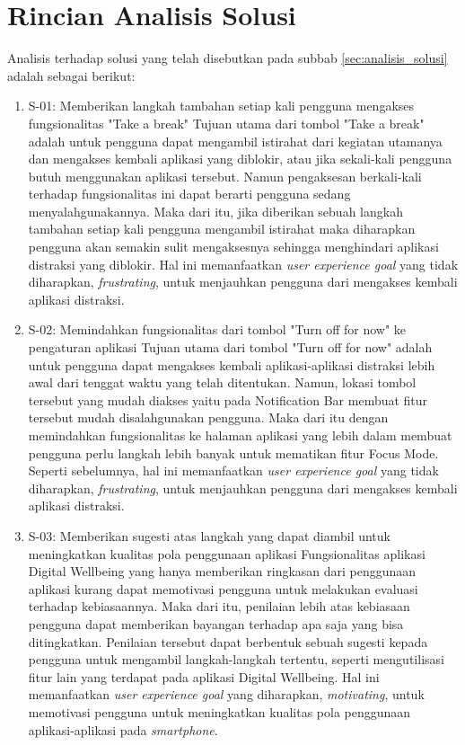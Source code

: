 \chapter{Rincian Analisis Solusi}
\label{chpt:rincian_analisis_solusi}

Analisis terhadap solusi yang telah disebutkan pada subbab \ref{sec:analisis_solusi} adalah sebagai berikut:

\begin{enumerate}
  \item S-01: Memberikan langkah tambahan setiap kali pengguna mengakses fungsionalitas "Take a break"
  \subitem
  Tujuan utama dari tombol "Take a break" adalah untuk pengguna dapat mengambil istirahat dari kegiatan utamanya dan mengakses kembali aplikasi yang diblokir, atau jika sekali-kali pengguna butuh menggunakan aplikasi tersebut. Namun pengaksesan berkali-kali terhadap fungsionalitas ini dapat berarti pengguna sedang menyalahgunakannya. Maka dari itu, jika diberikan sebuah langkah tambahan setiap kali pengguna mengambil istirahat maka diharapkan pengguna akan semakin sulit mengaksesnya sehingga menghindari aplikasi distraksi yang diblokir. Hal ini memanfaatkan \textit{user experience goal} yang tidak diharapkan, \textit{frustrating}, untuk menjauhkan pengguna dari mengakses kembali aplikasi distraksi.
  
  \item S-02: Memindahkan fungsionalitas dari tombol "Turn off for now" ke pengaturan aplikasi
  \subitem
  Tujuan utama dari tombol "Turn off for now" adalah untuk pengguna dapat mengakses kembali aplikasi-aplikasi distraksi lebih awal dari tenggat waktu yang telah ditentukan. Namun, lokasi tombol tersebut yang mudah diakses yaitu pada Notification Bar membuat fitur tersebut mudah disalahgunakan pengguna. Maka dari itu dengan memindahkan fungsionalitas ke halaman aplikasi yang lebih dalam membuat pengguna perlu langkah lebih banyak untuk mematikan fitur Focus Mode. Seperti sebelumnya, hal ini memanfaatkan \textit{user experience goal} yang tidak diharapkan, \textit{frustrating}, untuk menjauhkan pengguna dari mengakses kembali aplikasi distraksi. 
  
  \item S-03: Memberikan sugesti atas langkah yang dapat diambil untuk meningkatkan kualitas pola penggunaan aplikasi
  \subitem Fungsionalitas aplikasi Digital Wellbeing yang hanya memberikan ringkasan dari penggunaan aplikasi kurang dapat memotivasi pengguna untuk melakukan evaluasi terhadap kebiasaannya. Maka dari itu, penilaian lebih atas kebiasaan pengguna dapat memberikan bayangan terhadap apa saja yang bisa ditingkatkan. Penilaian tersebut dapat berbentuk sebuah sugesti kepada pengguna untuk mengambil langkah-langkah tertentu, seperti mengutilisasi fitur lain yang terdapat pada aplikasi Digital Wellbeing. Hal ini memanfaatkan \textit{user experience goal} yang diharapkan, \textit{motivating}, untuk memotivasi pengguna untuk meningkatkan kualitas pola penggunaan aplikasi-aplikasi pada \textit{smartphone}.

\end{enumerate}